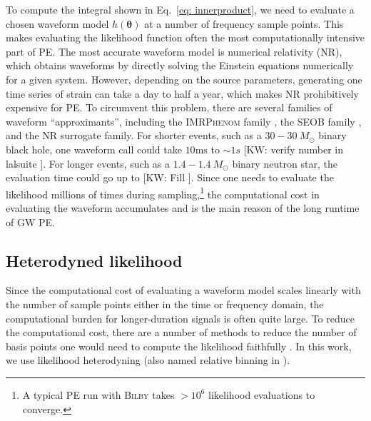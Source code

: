\documentclass[twocolumn]{aastex631}
\newcommand{\kw}[1]{{\color{rb4}[KW: #1 ]}}
\begin{document}
To compute the integral shown in Eq.~\eqref{eq: innerproduct}, we need to
evaluate a chosen waveform model $h(\mathbf{\theta})$ at a number of frequency
sample points. This makes evaluating the likelihood function often the most
computationally intensive part of PE. The most accurate waveform model is
numerical relativity (NR), which obtains waveforms by directly solving the
Einstein equations numerically for a given system. However, depending on the
source parameters, generating one time series of strain can take a day to half
a year, which makes NR prohibitively expensive for PE. To circumvent this
problem, there are several families of waveform ``approximants'', including the
\textsc{IMRPhenom} family \cite{Khan:2015jqa, Garcia-Quiros:2020qpx}, the
\textsc{SEOB} family \cite{PhysRevD.89.061502}, and the NR surrogate
family\cite{Varma:2019csw}. For shorter events, such as a $30-30\ M_{\odot}$
binary black hole, one waveform call could take $10\text{ms}$ to ${\sim}1s$
\kw{verify number in lalsuite}. For longer events, such as a $1.4-1.4\
M_{\odot}$ binary neutron star, the evaluation time could go up to \kw{Fill}.
Since one needs to evaluate the likelihood millions of times during
sampling,\footnote{A typical PE run with \textsc{Bilby} takes ${>}10^6$
likelihood evaluations to converge.} the computational cost in evaluating the
waveform accumulates and is the main reason of the long runtime of GW PE.

\subsection{Heterodyned likelihood}

Since the computational cost of evaluating a waveform model scales linearly
with the number of sample points either in the time or frequency domain, the
computational burden for longer-duration signals is often quite large. To
reduce the computational cost, there are a number of methods to reduce the
number of basis points one would need to compute the likelihood faithfully
\cite{Field:2011mf, Field:2013cfa, Smith:2016qas, Vinciguerra:2017ngf}. In this
work, we use likelihood heterodyning \cite{Cornish:2021lje} (also named
relative binning in \cite{Zackay:2018qdy}).
\end{document}
